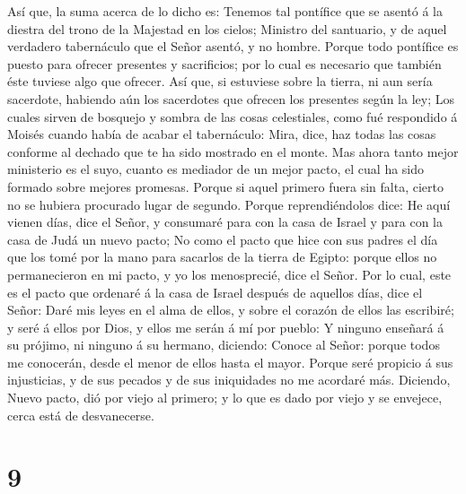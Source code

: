  Así que, la suma acerca de lo dicho es: Tenemos tal
pontífice que se asentó á la diestra del trono de la Majestad en los
cielos;  Ministro del santuario, y de aquel verdadero
tabernáculo que el Señor asentó, y no hombre.  Porque todo
pontífice es puesto para ofrecer presentes y sacrificios; por lo cual es
necesario que también éste tuviese algo que ofrecer.  Así
que, si estuviese sobre la tierra, ni aun sería sacerdote, habiendo aún
los sacerdotes que ofrecen los presentes según la ley; 
Los cuales sirven de bosquejo y sombra de las cosas celestiales, como
fué respondido á Moisés cuando había de acabar el tabernáculo: Mira,
dice, haz todas las cosas conforme al dechado que te ha sido mostrado en
el monte.  Mas ahora tanto mejor ministerio es el suyo,
cuanto es mediador de un mejor pacto, el cual ha sido formado sobre
mejores promesas.  Porque si aquel primero fuera sin
falta, cierto no se hubiera procurado lugar de segundo. 
Porque reprendiéndolos dice: He aquí vienen días, dice el Señor, y
consumaré para con la casa de Israel y para con la casa de Judá un nuevo
pacto;  No como el pacto que hice con sus padres el día
que los tomé por la mano para sacarlos de la tierra de Egipto: porque
ellos no permanecieron en mi pacto, y yo los menosprecié, dice el Señor.
 Por lo cual, este es el pacto que ordenaré á la casa de
Israel después de aquellos días, dice el Señor: Daré mis leyes en el
alma de ellos, y sobre el corazón de ellos las escribiré; y seré á ellos
por Dios, y ellos me serán á mí por pueblo:  Y ninguno
enseñará á su prójimo, ni ninguno á su hermano, diciendo: Conoce al
Señor: porque todos me conocerán, desde el menor de ellos hasta el
mayor.  Porque seré propicio á sus injusticias, y de sus
pecados y de sus iniquidades no me acordaré más. 
Diciendo, Nuevo pacto, dió por viejo al primero; y lo que es dado por
viejo y se envejece, cerca está de desvanecerse.

\hypertarget{section-8}{%
\section{9}\label{section-8}}

